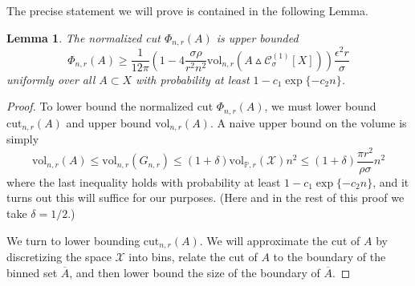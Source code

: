 \documentclass[11pt,twoside]{article}
\newtheorem{lemma}{Lemma}
\newcommand{\vol}{\mathrm{vol}}
\newcommand{\cut}{\mathrm{cut}}
\newcommand{\1}{\mathbf{1}}
\newcommand{\Xbf}{X}             %
\newcommand{\Pbb}{\mathbb{P}}
\begin{document}
The precise statement we will prove is contained in the following Lemma.
\begin{lemma}
	\label{lem:normalized_cut_lb}
	The normalized cut $\Phi_{n,r}(A)$ is upper bounded
	\begin{equation*}
	\Phi_{n,r}(A) \geq \frac{1}{12\pi} \left(1 - 4\frac{\sigma \rho}{r^2 n^2} \vol_{n,r}(A \vartriangle \mathcal{C}_{\sigma}^{(1)}[\Xbf]) \right) \frac{\epsilon^2 r}{\sigma}
	\end{equation*}
	uniformly over all $A \subset X$ with probability at least $1 - c_1\exp\{-c_2n\}$.
\end{lemma}
\begin{proof}
	To lower bound the normalized cut $\Phi_{n,r}(A)$, we must lower bound $\cut_{n,r}(A)$ and upper bound $\vol_{n,r}(A)$. A naive upper bound on the volume is simply 
	\begin{equation}
	\label{eqn:normalized_cut_lb_pf4}
	\vol_{n,r}(A) \leq \vol_{n,r}(G_{n,r}) \leq (1 + \delta)  \vol_{\Pbb,r}(\mathcal{X}) n^2 \leq (1 + \delta)\frac{\pi r^2}{\rho \sigma} n^2
 	\end{equation}
	where the last inequality holds with probability at least $1 - c_1\exp\{-c_2n\}$, and it turns out this will suffice for our purposes. (Here and in the rest of this proof we take $\delta = 1/2$.)
	
	We turn to lower bounding $\cut_{n,r}(A)$. We will approximate the cut of $A$ by discretizing the space $\mathcal{X}$ into bins, relate the cut of $A$ to the boundary of the binned set $\overline{A}$, and then lower bound the size of the boundary of $\overline{A}$.
	

\end{proof}
\end{document}
